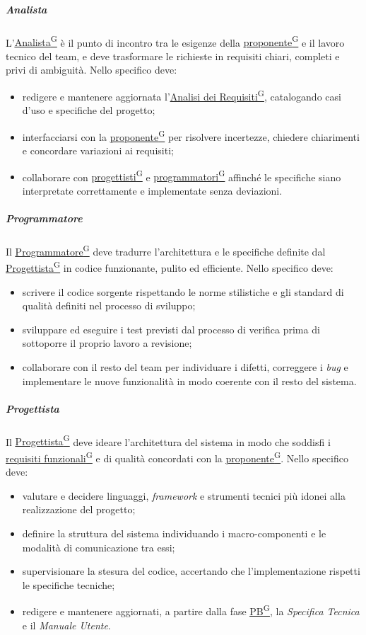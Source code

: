 \documentclass[a4paper,12pt]{article}
\providecommand{\glslink}[2]{\href{https://alittlebyte-19.github.io/Documentazione/glossario.html\#gls-#1}{\underline{#2}\textsuperscript{\scriptsize G}}}
\begin{document}
\subparagraph{Analista}
L'\glslink{analista}{Analista} è il punto di incontro tra le esigenze della \glslink{committente-proponente}{proponente} e il lavoro tecnico del team, e deve trasformare le richieste in requisiti chiari, completi e privi di ambiguità. Nello specifico deve:
\begin{itemize}
    \item redigere e mantenere aggiornata l'\glslink{analisi-dei-requisiti-adr}{Analisi dei Requisiti}, catalogando casi d'uso e specifiche del progetto;
    \item interfacciarsi con la \glslink{committente-proponente}{proponente} per risolvere incertezze, chiedere chiarimenti e concordare variazioni ai requisiti;
    \item collaborare con \glslink{progettista}{progettisti} e \glslink{programmatore}{programmatori} affinché le specifiche siano interpretate correttamente e implementate senza deviazioni.
\end{itemize}

\subparagraph{Programmatore}
Il \glslink{programmatore}{Programmatore} deve tradurre l'architettura e le specifiche definite dal \glslink{progettista}{Progettista} in codice funzionante, pulito ed efficiente. Nello specifico deve:
\begin{itemize}
    \item scrivere il codice sorgente rispettando le norme stilistiche e gli standard di qualità definiti nel processo di sviluppo;
    \item sviluppare ed eseguire i test previsti dal processo di verifica prima di sottoporre il proprio lavoro a revisione;
    \item collaborare con il resto del team per individuare i difetti, correggere i \textit{bug} e implementare le nuove funzionalità in modo coerente con il resto del sistema.
\end{itemize}

\subparagraph{Progettista}
Il \glslink{progettista}{Progettista} deve ideare l'architettura del sistema in modo che soddisfi i \glslink{requisiti-funzionali}{requisiti funzionali} e di qualità concordati con la \glslink{committente-proponente}{proponente}. Nello specifico deve:
\begin{itemize}
    \item valutare e decidere linguaggi, \textit{framework} e strumenti tecnici più idonei alla realizzazione del progetto;
    \item definire la struttura del sistema individuando i macro-componenti e le modalità di comunicazione tra essi;
    \item supervisionare la stesura del codice, accertando che l'implementazione rispetti le specifiche tecniche;
    \item redigere e mantenere aggiornati, a partire dalla fase \glslink{pb-product-baseline}{PB}, la \textit{Specifica Tecnica} e il \textit{Manuale Utente}.
\end{itemize}
\end{document}
